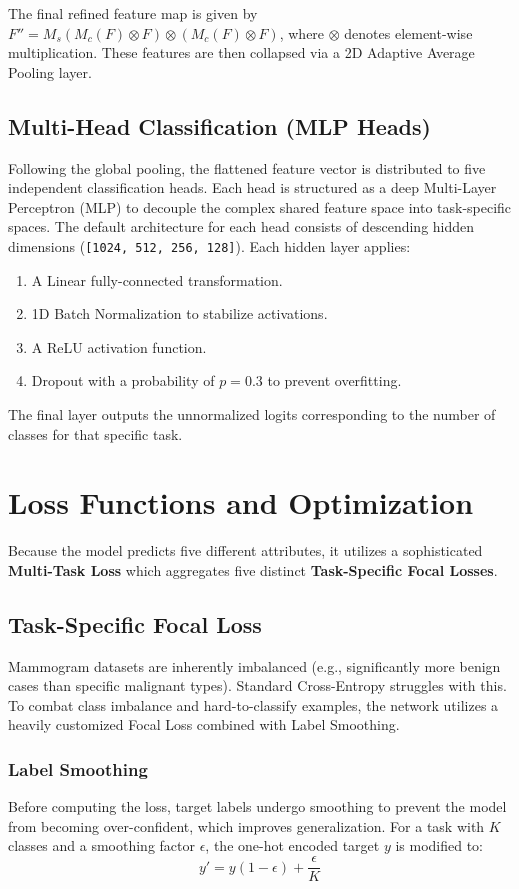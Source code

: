 \documentclass[11pt,a4paper]{article}
\begin{document}
The final refined feature map is given by $F'' = M_s(M_c(F) \otimes F) \otimes (M_c(F) \otimes F)$, where $\otimes$ denotes element-wise multiplication. These features are then collapsed via a 2D Adaptive Average Pooling layer.

\subsection{Multi-Head Classification (MLP Heads)}
Following the global pooling, the flattened feature vector is distributed to five independent classification heads. Each head is structured as a deep Multi-Layer Perceptron (MLP) to decouple the complex shared feature space into task-specific spaces.
The default architecture for each head consists of descending hidden dimensions (\texttt{[1024, 512, 256, 128]}). Each hidden layer applies:
\begin{enumerate}
    \item A Linear fully-connected transformation.
    \item 1D Batch Normalization to stabilize activations.
    \item A ReLU activation function.
    \item Dropout with a probability of $p=0.3$ to prevent overfitting.
\end{enumerate}
The final layer outputs the unnormalized logits corresponding to the number of classes for that specific task.

\section{Loss Functions and Optimization}

Because the model predicts five different attributes, it utilizes a sophisticated \textbf{Multi-Task Loss} which aggregates five distinct \textbf{Task-Specific Focal Losses}.

\subsection{Task-Specific Focal Loss}
Mammogram datasets are inherently imbalanced (e.g., significantly more benign cases than specific malignant types). Standard Cross-Entropy struggles with this. To combat class imbalance and hard-to-classify examples, the network utilizes a heavily customized Focal Loss combined with Label Smoothing.

\subsubsection{Label Smoothing}
Before computing the loss, target labels undergo smoothing to prevent the model from becoming over-confident, which improves generalization. For a task with $K$ classes and a smoothing factor $\epsilon$, the one-hot encoded target $y$ is modified to:
\begin{equation}
y' = y(1 - \epsilon) + \frac{\epsilon}{K}
\end{equation}
\end{document}
